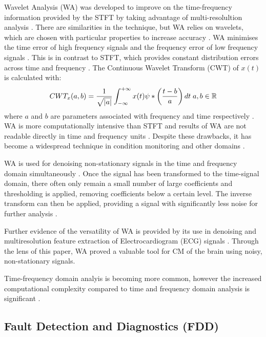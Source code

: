 Wavelet Analysis (WA) was developed to improve on the time-frequency information provided by the STFT by taking advantage of multi-resolultion analysis \cite{wavelet_tut}\cite{CM_wavelets}.
There are similarities in the technique, but WA relies on wavelets, which are chosen with particular properties to increase accuracy \cite{CM_wavelets}.
WA minimises the time error of high frequency signals and the frequency error of low frequency signals \cite{wavelet_tut}.
This is in contrast to STFT, which provides constant distribution errors across time and frequency \cite{CM_wavelets}.
The Continuous Wavelet Transform (CWT) of $x(t)$ is calculated with:
\begin{equation*}
  CWT_x(a, b) = \frac{1}{\sqrt{\lvert a\rvert}}\int^{+\infty}_{-\infty}x(t)\psi*\left(\frac{t-b}{a}\right)dt\;a, b\in \mathbb{R}
\end{equation*}
where $a$ and $b$ are parameters associated with frequency and time respectively \cite{CM_waveletVsFourier}.
WA is more computationally intensive than STFT and results of WA are not readable directly in time and frequency units \cite{CM_wavelets}.
Despite these drawbacks, it has become a widespread technique in condition monitoring and other domains \cite{CM_dai_gao_2013}.
\par

WA is used for denoising non-stationary signals in the time and frequency domain simultaneously \cite{CM_randall}.
Once the signal has been transformed to the time-signal domain, there often only remain a small number of large coefficients and thresholding is applied, removing coefficients below a certain level.
The inverse transform can then be applied, providing a signal with significantly less noise for further analysis \cite{CM_wavelets}.
\par

Further evidence of the versatility of WA is provided by its use in denoising and multiresolution feature extraction of Electrocardiogram (ECG) signals \cite{CM_wavelet_ecg}.
Through the lens of this paper, WA proved a valuable tool for CM of the brain using noisy, non-stationary signals.
\par

Time-frequency domain analyis is becoming more common, however the increased computational complexity compared to time and frequency domain analysis is significant \cite{CM_randall}.


\subsection{Fault Detection and Diagnostics (FDD)}\label{sec:CM_diag}

